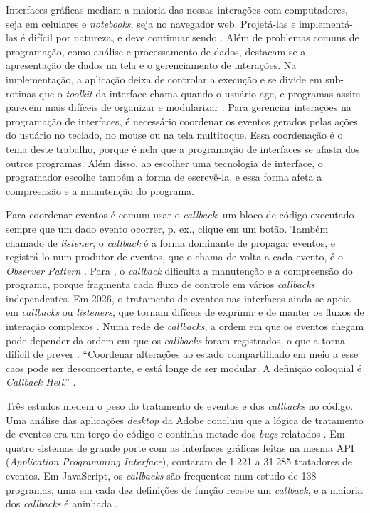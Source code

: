 Interfaces gráficas mediam a maioria das nossas interações com computadores,
seja em celulares e \emph{notebooks}, seja no navegador web.
Projetá-las e implementá-las é difícil por natureza, e deve continuar sendo
\cite[p. 73]{myers1994}.
Além de problemas comuns de programação, como análise e processamento de dados,
destacam-se a apresentação de dados na tela e o gerenciamento de interações.
Na implementação, a aplicação deixa de controlar a execução e se divide em
sub-rotinas que o \emph{toolkit} da interface chama quando o usuário age, e
programas assim parecem mais difíceis de organizar e modularizar
\cite[p. 79]{myers1994}.
Para gerenciar interações na programação de interfaces, é necessário coordenar
os eventos gerados pelas ações do usuário no teclado, no mouse ou na tela
multitoque.
Essa coordenação é o tema deste trabalho, porque é nela que a programação de
interfaces se afasta dos outros programas.
Além disso, ao escolher uma tecnologia de interface, o programador escolhe
também a forma de escrevê-la, e essa forma afeta a compreensão e a manutenção
do programa.

Para coordenar eventos é comum usar o \emph{callback}: um bloco de código executado
sempre que um dado evento ocorrer, p. ex., clique em um botão.
Também chamado de \emph{listener}, o \emph{callback} é a forma dominante de propagar
eventos, e registrá-lo num produtor de eventos, que o chama de volta a cada
evento, é o \emph{Observer Pattern} \cite[p. 7]{blackheath2016}.
Para \textcite[p. 134]{fischer2007}, o \emph{callback} dificulta a manutenção
e a compreensão do programa, porque fragmenta cada fluxo de controle em
vários \emph{callbacks} independentes.
Em 2026, o tratamento de eventos nas interfaces ainda se apoia em
\emph{callbacks} ou \emph{listeners}, que tornam difíceis de exprimir e de manter os
fluxos de interação complexos \cite[p. 8]{grolaux2026}.
Numa rede de \emph{callbacks}, a ordem em que os eventos chegam pode depender da
ordem em que os \emph{callbacks} foram registrados, o que a torna difícil de prever
\cite[p. 8]{blackheath2016}.
“Coordenar alterações ao estado compartilhado em meio a esse caos pode ser
desconcertante, e está longe de ser modular. A definição coloquial é \emph{Callback
Hell}.” \cite[p. 926; tradução nossa]{edwards2009}.

Três estudos medem o peso do tratamento de eventos e dos \emph{callbacks} no código.
Uma análise das aplicações \emph{desktop} da Adobe concluiu que a lógica de
tratamento de eventos era um terço do código e continha metade dos \emph{bugs}
relatados \cite[p. 926]{edwards2009}.
Em quatro sistemas de grande porte com as interfaces gráficas feitas na
mesma API (\emph{Application Programming Interface}), \textcite[p. 770]{mijailovic2014} contaram de 1.221 a 31.285
tratadores de eventos.
Em JavaScript, os \emph{callbacks} são frequentes: num estudo de 138 programas, uma
em cada dez definições de função recebe um \emph{callback}, e a maioria dos
\emph{callbacks} é aninhada \cite[p. 1]{gallaba2015}.

